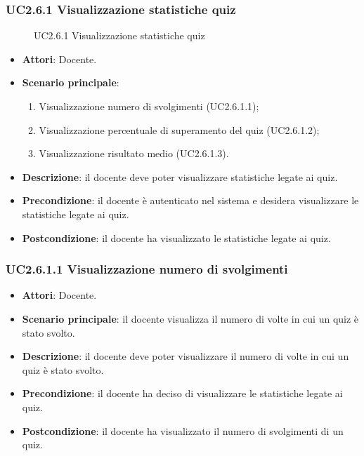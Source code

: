 \subsubsection{UC2.6.1 Visualizzazione statistiche quiz}
\begin{figure}[H]
\centering
\noindent{}
\caption{UC2.6.1 Visualizzazione statistiche quiz}
\end{figure}
\begin{itemize}
\item \textbf{Attori}: Docente.
\item \textbf{Scenario principale}:
\begin{enumerate}
\item Visualizzazione numero di svolgimenti (UC2.6.1.1);
\item Visualizzazione percentuale di superamento del quiz (UC2.6.1.2);
\item Visualizzazione risultato medio (UC2.6.1.3).
\end{enumerate}
\item \textbf{Descrizione}: il docente deve poter visualizzare statistiche legate ai quiz.
\item \textbf{Precondizione}: il docente è autenticato nel sistema e desidera visualizzare le statistiche legate ai quiz.
\item \textbf{Postcondizione}: il docente ha visualizzato le statistiche legate ai quiz.
\end{itemize}
\subsubsection{UC2.6.1.1 Visualizzazione numero di svolgimenti}
\begin{itemize}
\item \textbf{Attori}: Docente.
\item \textbf{Scenario principale}: il docente visualizza il numero di volte in cui un quiz è stato svolto.
\item \textbf{Descrizione}: il docente deve poter visualizzare il numero di volte in cui un quiz è stato svolto.
\item \textbf{Precondizione}: il docente ha deciso di visualizzare le statistiche legate ai quiz.
\item \textbf{Postcondizione}: il docente ha visualizzato il numero di svolgimenti di un quiz.
\end{itemize}
